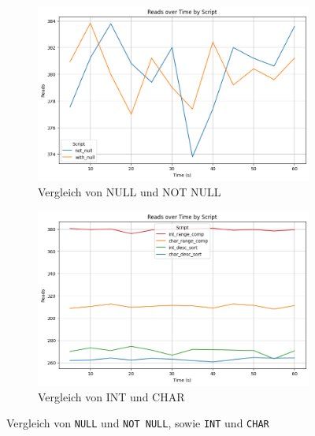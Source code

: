 \vspace{-8pt}
\begin{figure}[H]
    \centering
    \begin{subfigure}[t]{0.48\textwidth}
        \centering
        \includegraphics[width=\textwidth]{PNGs/Script/Data_Types/Null/null-check/Reads}
        \caption{Vergleich von NULL und NOT NULL}
        \label{data-types-null-reads}
    \end{subfigure}
    \hfill
    \begin{subfigure}[t]{0.48\textwidth}
        \centering
        \includegraphics[width=\textwidth]{PNGs/Script/Data_Types/Simpler/int-char/Reads}
        \caption{Vergleich von INT und CHAR}
        \label{data-types-int-char-reads}
    \end{subfigure}
    \vspace{-6pt}
    \caption[Datentypen: Vergleich mit Not Null, sowie Int und Char]{Vergleich von \texttt{NULL} und \texttt{NOT NULL}, sowie \texttt{INT} und \texttt{CHAR}}
\end{figure}
\vspace{-20pt}

